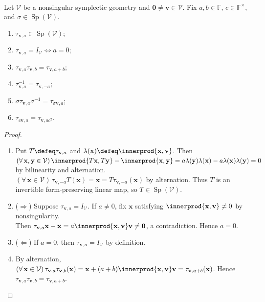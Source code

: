 \begin{proposition} \label{prop:symplectic-transvection-properties} \\
Let $\mathcal{V}$ be a nonsingular symplectic geometry and $\mathbf{0}\neq\mathbf{v}\in\mathcal{V}$. Fix $a,b\in\mathbb{F}$, $c\in\mathbb{F}^{\times}$, and $\sigma\in\operatorname{Sp}(\mathcal{V})$.
\begin{enumerate}[label=(\roman*)]
\setlength{\itemsep}{0pt}
\item $\tau_{\mathbf{v},a}\in\operatorname{Sp}(\mathcal{V})$;
\item $\tau_{\mathbf{v},a}=I_{\mathcal{V}}\Longleftrightarrow a=0$;
\item $\tau_{\mathbf{v},a}\tau_{\mathbf{v},b}=\tau_{\mathbf{v},a+b}$;
\item $\tau_{\mathbf{v},a}^{-1}=\tau_{\mathbf{v},-a}$;
\item $\sigma\tau_{\mathbf{v},a}\sigma^{-1}=\tau_{\sigma\mathbf{v},a}$;
\item $\tau_{c\mathbf{v},a}=\tau_{\mathbf{v},ac^2}$.
\end{enumerate}
\begin{proof}
\begin{enumerate}[label=(\roman*)]
\setlength{\itemsep}{0pt}
\item[$(i)$] Put $T\defeq\tau_{\mathbf{v},a}$ and $\lambda(\mathbf{x})\defeq\innerprod{\mathbf{x},\mathbf{v}}$. Then $(\forall\,\mathbf{x},\mathbf{y}\in\mathcal{V})\,\innerprod{T\mathbf{x},T\mathbf{y}}-\innerprod{\mathbf{x},\mathbf{y}}=a\lambda(\mathbf{y})\lambda(\mathbf{x})-a\lambda(\mathbf{x})\lambda(\mathbf{y})=0$ by bilinearity and alternation.\\
$(\forall\,\mathbf{x}\in\mathcal{V})\,\tau_{\mathbf{v},-a}T(\mathbf{x})=\mathbf{x}=T\tau_{\mathbf{v},-a}(\mathbf{x})$ by alternation. Thus $T$ is an invertible form-preserving linear map, so $T\in\operatorname{Sp}(\mathcal{V})$.
\item[$(ii)$] ($\Rightarrow$) Suppose $\tau_{\mathbf{v},a}=I_{\mathcal{V}}$. If $a\neq0$, fix $\mathbf{x}$ satisfying $\innerprod{\mathbf{x},\mathbf{v}}\neq0$ by nonsingularity.\\
Then $\tau_{\mathbf{v},a}\mathbf{x}-\mathbf{x}=a\innerprod{\mathbf{x},\mathbf{v}}\mathbf{v}\neq\mathbf{0}$, a contradiction. Hence $a=0$.
\item[$(ii)$] ($\Leftarrow$) If $a=0$, then $\tau_{\mathbf{v},a}=I_{\mathcal{V}}$ by definition.
\item[$(iii)$] By alternation, $(\forall\,\mathbf{x}\in\mathcal{V})\,\tau_{\mathbf{v},a}\tau_{\mathbf{v},b}(\mathbf{x})=\mathbf{x}+(a+b)\innerprod{\mathbf{x},\mathbf{v}}\mathbf{v}=\tau_{\mathbf{v},a+b}(\mathbf{x})$. Hence $\tau_{\mathbf{v},a}\tau_{\mathbf{v},b}=\tau_{\mathbf{v},a+b}$.

\end{enumerate}
\end{proof}
\end{proposition}
